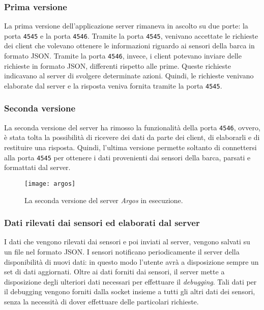 \subsubsection{Prima versione}
La prima versione dell'applicazione server rimaneva in ascolto su due porte: la porta \verb|4545| e la porta \verb|4546|. Tramite la porta \verb|4545|, venivano accettate le richieste dei client che volevano ottenere le informazioni riguardo ai sensori della barca in formato JSON. Tramite la porta \verb|4546|, invece, i client potevano inviare delle richieste in formato JSON, differenti rispetto alle prime. Queste richieste indicavano al server di svolgere determinate azioni. Quindi, le richieste venivano elaborate dal server e la risposta veniva fornita tramite la porta \verb|4545|.

\subsubsection{Seconda versione}
La seconda versione del server ha rimosso la funzionalità della porta \verb|4546|, ovvero, è stata tolta la possibilità di ricevere dei dati da parte dei client, di elaborarli e di restituire una risposta. Quindi, l'ultima versione permette soltanto di connettersi alla porta \verb|4545| per ottenere i dati provenienti dai sensori della barca, parsati e formattati dal server.

\begin{figure}
	\begin{center}
		\texttt{[image: argos]}
		\caption[Argos]{La seconda versione del server \textit{Argos} in esecuzione.}
		\label{figura:argos}
	\end{center}
\end{figure}

\newpage

\subsubsection{Dati rilevati dai sensori ed elaborati dal server}
I dati che vengono rilevati dai sensori e poi inviati al server, vengono salvati su un file nel formato JSON. I sensori notificano periodicamente il server della disponibilità di nuovi dati: in questo modo l'utente avrà a disposizione sempre un set di dati aggiornati. Oltre ai dati forniti dai sensori, il server mette a disposizione degli ulteriori dati necessari per effettuare il \textit{debugging}. Tali dati per il debugging vengono forniti dalla socket insieme a tutti gli altri dati dei sensori, senza la necessità di dover effettuare delle particolari richieste.


